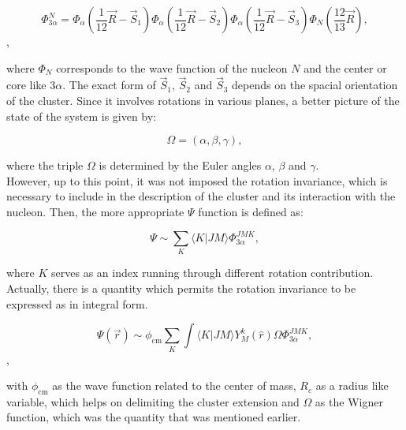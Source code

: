 \documentclass[openany]{book}
\begin{document}
\begin{equation} 	\label{eq:micro_multicluster_abc}
	\Phi^{N}_{3\alpha} = \Phi_\alpha \left (\frac{1}{12} \vec R - \vec S_1 \right )  \Phi_\alpha \left (\frac{1}{12} \vec R - \vec S_2 \right )  \Phi_\alpha \left (\frac{1}{12} \vec R - \vec S_3 \right )  \Phi_N \left( \frac{12}{13} \vec R \right),
\end{equation},

where $\Phi_N$ corresponds to the wave function of the nucleon $N$ and the center or core like $3\alpha$. The exact form of $\vec S_1$, $\vec S_2$ and $\vec S_3$ depends on the spacial orientation of the cluster. Since it involves rotations in various planes, a better picture of the state of the system is given by:

\begin{equation} 	\label{eq:micro_multicluster_eulerAlgles}
	\Omega = (\alpha, \beta, \gamma),
\end{equation}

where the triple $\Omega$ is determined by the Euler angles $\alpha$, $\beta$ and $\gamma$. \\

However, up to this point, it was not imposed the rotation invariance, which is necessary to include in the description of the cluster and its interaction with the nucleon. Then, the more appropriate $\Psi$ function is defined as: 

 \begin{equation} 	\label{eq:micro_multicluster_psi}
 	\Psi \sim \sum_{K} \langle K | JM \rangle \Phi^{JMK}_{3\alpha},
 \end{equation}

where $K$ serves as an index running through different rotation contribution. Actually, there is a quantity which permits the rotation invariance to be expressed as in integral form. 

 \begin{equation} 	\label{eq:micro_multicluster_psi_integral}
	\Psi(\vec r) \sim \phi_{\mathrm{cm}} \sum_{K}  \int \langle K | JM \rangle  Y^{k}_{M}(\hat r )  \mathcal{\Omega} \Phi^{JMK}_{3\alpha},
\end{equation}, 

with $\phi_{\mathrm{cm}} $ as the wave function related to the center of mass, $R_c$ as a radius like variable, which helps on delimiting the cluster extension and $\mathcal{\Omega}$ as the Wigner function, which was the quantity that was mentioned earlier. \\
\end{document}
